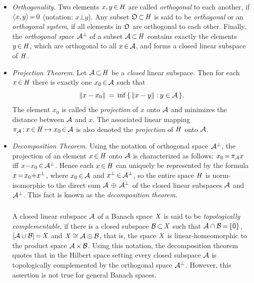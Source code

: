 \documentclass[11pt,twoside]{article}
\begin{document}
\begin{itemize}[leftmargin=22pt,itemsep=6pt]
\item[1.] \textit{Orthogonality}.
Two elements $x,y {\,\in\,} \mathit{H}$ are called \textit{orthogonal} to each another,
if $\langle x,y \rangle {\,=\,} 0$ (notation: $x {\bot} y$).
Any subset $\mathfrak{O} {\,\subset\,} \mathit{H}$ is said to be \textit{orthogonal}
or an \textit{orthogonal system},
if all elements in $\mathfrak{O}$ are orthogonal to each other.
Finally,
the \textit{orthogonal space} $\mathcal{A}^{\bot}$
of a subset $\mathcal{A} {\,\subset\,} \mathit{H}$
contains exactly the elements $y {\,\in\,} \mathit{H}$,
which are orthogonal to all $x {\,\in\,} \mathcal{A}$,
and forms a closed linear subspace of $\mathit{H}$.

\item[2.] \textit{Projection Theorem}.
Let $\mathcal{A} {\,\subset\,} \mathit{H}$ be a \textit{closed} linear subspace.
Then for each $x {\,\in\,} \mathit{H}$ there is exactly one $x_0 {\,\in\,} \mathcal{A}$
such that
\[
\left\lVert  x - x_0  \right\rVert \,=\, \inf \, \{ \, \left\lVert x-y \right\rVert {\,:\,} y \in \mathcal{A} \,\}.
\]
The element $x_0$ is called the \textit{projection} of $x$ onto $\mathcal{A}$
and minimizes the distance between $\mathcal{A}$ and $x$.
The associated linear mapping
$\pi_{\mathcal{A}} {\,:\,} x {\,\in\,} \mathit{H} \mapsto x_0 {\,\in\,} \mathcal{A}$
is also denoted the \textit{projection} of $\mathit{H}$ onto $\mathcal{A}$.

\item[3.] \textit{Decomposition Theorem}.
Using the notation of orthogonal space $\mathcal{A}^{\bot}$,
the projection of an element $x {\,\in\,} \mathit{H}$ onto $\mathcal{A}$
is characterized as follows:
$x_0 {\,=\,} \pi_{\mathcal{A}} x$ iff $x {-} x_0 {\,\in\,} \mathcal{A}^{\bot}$.
Hence each $x {\,\in\,} \mathit{H}$ can uniquely be represented by the formula
$x {\,=\,} x_0 {+} x^{\bot}$,
where $x_0 {\,\in\,} \mathcal{A}$ and $x^{\bot} {\,\in\,} \mathcal{A}^{\bot}$,
so the entire space $\mathit{H}$ is norm-isomorphic
to the direct sum $\mathcal{A} \, \oplus \, \mathcal{A}^{\bot}$
of the closed linear subspaces $\mathcal{A}$ and $\mathcal{A}^{\bot}$.
This fact is known as the \textit{decomposition theorem}.

\subparagraph{}
A closed linear subspace $\mathcal{A}$ of a Banach space $\mathit{X}$
is said to be \textit{topologically complementable},
if there is a closed subspace $\mathcal{B} {\,\subset\,} \mathit{X}$
such that $\mathcal{A} \cap \mathcal{B} {\,=\,} \{{\mathsf{0}}\}$,
          $[\mathcal{A} \cup \mathcal{B}] {\,=\,} \mathit{X}$ and $\mathit{X} \cong \mathcal{A} \oplus \mathcal{B}$,
that is,
the space $\mathit{X}$ is linear-homeomorphic
to the product space $\mathcal{A} {\,\times\,} \mathcal{B}$.
Using this notation, the decomposition theorem quotes that
in the Hilbert space setting every closed subspace $\mathcal{A}$ is topologically
complemented by the orthogonal space $\mathcal{A}^{\bot}$.
However,
this assertion is not true for general Banach spaces.


\end{itemize}
\end{document}
